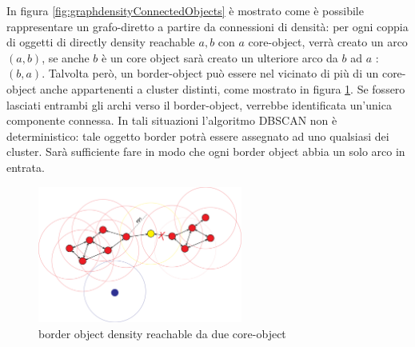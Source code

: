 \documentclass[a4paper,12pt]{report}
\begin{document}
In figura \ref{fig:graphdensityConnectedObjects} è mostrato come è possibile rappresentare un grafo-diretto a partire da connessioni di densità: per ogni coppia di oggetti di  directly density reachable $a,b$ con $a$ core-object,
verrà creato un arco $(a,b)$, se anche $b$ è un core object sarà creato un ulteriore arco da $b$ ad $a$ : $(b,a)$.
Talvolta però, un border-object può essere nel vicinato di più di un core-object anche appartenenti a cluster distinti, come mostrato in figura \ref{fig:dbscanGraphRevisited}. Se fossero lasciati entrambi gli archi verso il border-object, verrebbe identificata un'unica componente connessa.
In tali situazioni l'algoritmo DBSCAN non è deterministico:
tale oggetto border potrà essere assegnato ad uno qualsiasi dei cluster. Sarà sufficiente  
fare in modo che ogni border object abbia un solo arco in entrata. 
\begin{figure}
\centering
\includegraphics[width=0.6\textwidth]{dbscanRevisited}
\caption{border object density reachable da due core-object}
\label{fig:dbscanGraphRevisited}
 \end{figure}
 
   
\end{document}

